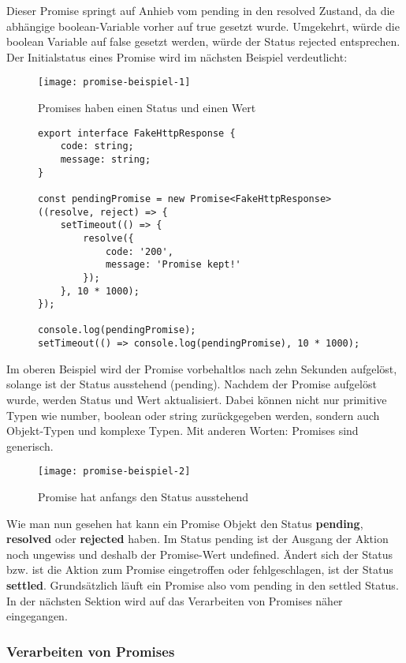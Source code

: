 \noindent
Dieser Promise springt auf Anhieb vom pending in den resolved Zustand, da die abhängige boolean-Variable vorher auf true gesetzt wurde. Umgekehrt, würde die boolean Variable auf false gesetzt werden, würde der Status rejected entsprechen. Der Initialstatus eines Promise wird im nächsten Beispiel verdeutlicht:

\begin{figure}[H]
\centering
\texttt{[image: promise-beispiel-1]}
\caption{Promises haben einen Status und einen Wert}
\end{figure}

\begin{figure}[H]
\begin{lstlisting}
export interface FakeHttpResponse {
    code: string;
    message: string;
}

const pendingPromise = new Promise<FakeHttpResponse>((resolve, reject) => {
    setTimeout(() => {
        resolve({
            code: '200',
            message: 'Promise kept!'
        });
    }, 10 * 1000);
});

console.log(pendingPromise);
setTimeout(() => console.log(pendingPromise), 10 * 1000);
\end{lstlisting}
\end{figure}

\noindent
Im oberen Beispiel wird der Promise vorbehaltlos nach zehn Sekunden aufgelöst, solange ist der Status ausstehend (pending). Nachdem der Promise aufgelöst wurde, werden Status und Wert aktualisiert. Dabei können nicht nur primitive Typen wie number, boolean oder string zurückgegeben werden, sondern auch Objekt-Typen und komplexe Typen. Mit anderen Worten: Promises sind generisch.

\begin{figure}[H]
\centering
\texttt{[image: promise-beispiel-2]}
\caption{Promise hat anfangs den Status \glqq{}ausstehend\grqq{}}
\end{figure}

\noindent
Wie man nun gesehen hat kann ein Promise Objekt den Status  \textbf{pending}, \textbf{resolved} oder \textbf{rejected} haben. Im Status pending ist der Ausgang der Aktion noch ungewiss und deshalb der Promise-Wert undefined. Ändert sich der Status bzw. ist die Aktion zum Promise eingetroffen oder fehlgeschlagen, ist der Status \textbf{settled}. Grundsätzlich läuft ein Promise also vom pending in den settled Status. In der nächsten Sektion wird auf das Verarbeiten von Promises näher eingegangen.

\subsubsection{Verarbeiten von Promises}

